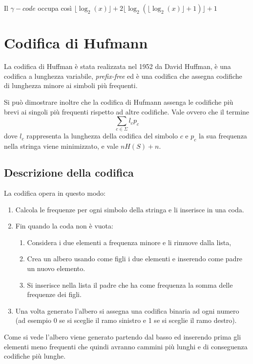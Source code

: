 \documentclass[a4paper,11pt]{book}
\begin{document}
Il $\gamma-code$ occupa cos\`i $\lfloor \log_2 (x) \rfloor + 2 \lfloor \log_2 (\lfloor \log_2 (x) \rfloor+1) \rfloor + 1$

\section{Codifica di Hufmann}

La codifica di Huffman \`e stata realizzata nel 1952 da David Huffman, \`e una codifica a lunghezza variabile, \emph{prefix-free} ed \`e una codifica che assegna codifiche di lunghezza minore ai simboli pi\`u frequenti.

Si pu\`o dimostrare inoltre che la codifica di Hufmann assenga le codifiche pi\`u brevi ai singoli pi\`u frequenti rispetto ad altre codifiche.
Vale ovvero che il termine $$ \sum_{c\in\Sigma}l_{c}p_c$$ dove $l_c$ rappresenta la lunghezza della codifica del simbolo $c$ e $p_c$ la sua frequenza nella stringa viene minimizzato, e vale $nH(S) + n$.

\subsection{Descrizione della codifica}

La codifica opera in questo modo:
\begin{enumerate}
\item Calcola le frequenze per ogni simbolo della stringa e li inserisce in una coda.
\item Fin quando la coda non \`e vuota:
\begin{enumerate}
\item Considera i due elementi a frequenza minore e li rimuove dalla lista,
\item Crea un albero usando come figli i due elementi e inserendo come padre un nuovo elemento.
\item Si inserisce nella lista il padre che ha come frequenza la somma delle frequenze dei figli.
\end{enumerate}
\item Una volta generato l'albero si assegna una codifica binaria ad ogni numero (ad esempio 0 se si sceglie il ramo sinistro e 1 se si sceglie il ramo destro).
\end{enumerate}

Come si vede l'albero viene generato partendo dal basso ed inserendo prima gli elementi meno frequenti che quindi avranno cammini pi\`u lunghi e di conseguenza codifiche pi\`u lunghe.
\end{document}

